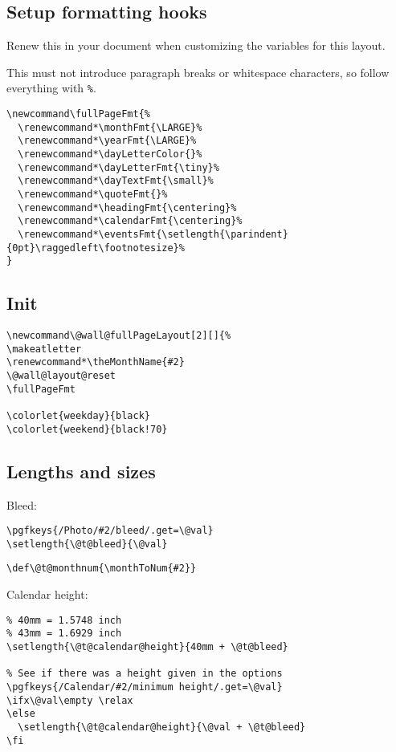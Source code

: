\documentclass[11pt,oneside]{memoir-article}
\begin{document}
\subsection{Setup formatting hooks}
\label{sec-10-4-1}

Renew this in your document when customizing the variables for this layout.

This must not introduce paragraph breaks or whitespace characters, so follow
everything with \texttt{\%}.

\begin{verbatim}
\newcommand\fullPageFmt{%
  \renewcommand*\monthFmt{\LARGE}%
  \renewcommand*\yearFmt{\LARGE}%
  \renewcommand*\dayLetterColor{}%
  \renewcommand*\dayLetterFmt{\tiny}%
  \renewcommand*\dayTextFmt{\small}%
  \renewcommand*\quoteFmt{}%
  \renewcommand*\headingFmt{\centering}%
  \renewcommand*\calendarFmt{\centering}%
  \renewcommand*\eventsFmt{\setlength{\parindent}{0pt}\raggedleft\footnotesize}%
}
\end{verbatim}

\subsection{Init}
\label{sec-10-4-2}

\begin{verbatim}
\newcommand\@wall@fullPageLayout[2][]{%
\makeatletter
\renewcommand*\theMonthName{#2}
\@wall@layout@reset
\fullPageFmt

\colorlet{weekday}{black}
\colorlet{weekend}{black!70}
\end{verbatim}

\subsection{Lengths and sizes}
\label{sec-10-4-3}

Bleed:

\begin{verbatim}
\pgfkeys{/Photo/#2/bleed/.get=\@val}
\setlength{\@t@bleed}{\@val}
\end{verbatim}

\begin{verbatim}
\def\@t@monthnum{\monthToNum{#2}}
\end{verbatim}

Calendar height:

\begin{verbatim}
% 40mm = 1.5748 inch
% 43mm = 1.6929 inch
\setlength{\@t@calendar@height}{40mm + \@t@bleed}

% See if there was a height given in the options
\pgfkeys{/Calendar/#2/minimum height/.get=\@val}
\ifx\@val\empty \relax
\else
  \setlength{\@t@calendar@height}{\@val + \@t@bleed}
\fi
\end{verbatim}
\end{document}
